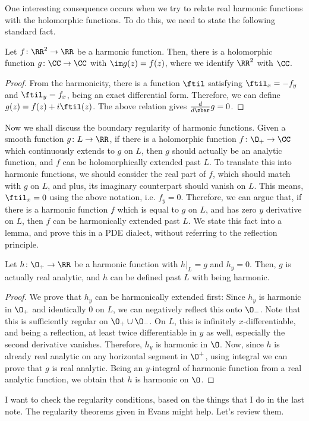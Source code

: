 \documentclass[a4paper]{amsart}
\begin{document}
One interesting consequence occurs when we try to relate real harmonic functions with the holomorphic functions. 
To do this, we need to state the following standard fact. 
\begin{lem*}
    Let \(f\colon \RR^2\to \RR\) be a harmonic function. 
    Then, there is a holomorphic function \(g\colon \CC\to \CC\) with \(\im g(z) = f(z)\), where we identify \(\RR^2\) with \(\CC\). 
\end{lem*}
\begin{proof}
    From the harmonicity, there is a function \(\ftil\) satisfying \(\ftil_x = -f_y\) and \(\ftil_y = f_x\), being an exact differential form. 
    Therefore, we can define \(g(z) = f(z) + i\ftil(z)\). 
    The above relation gives \(\frac{d}{d\zbar}g = 0\).
\end{proof}

Now we shall discuss the boundary regularity of harmonic functions. 
Given a smooth function \(g\colon L\to \RR\), if there is a holomorphic function \(f\colon \O_+\to \CC\) which continuously extends to \(g\) on \(L\), then \(g\) should actually be an analytic function, and \(f\) can be holomorphically extended past \(L\). 
To translate this into harmonic functions, we should consider the real part of \(f\), which should match with \(g\) on \(L\), and plus, its imaginary counterpart should vanish on \(L\). 
This means, \(\ftil_x = 0\) using the above notation, i.e. \(f_y = 0\). 
Therefore, we can argue that, if there is a harmonic function \(f\) which is equal to \(g\) on \(L\), and has zero \(y\) derivative on \(L\), then \(f\) can be harmonically extended past \(L\).
We state this fact into a lemma, and prove this in a PDE dialect, without referring to the reflection principle. 

\begin{lem*}
    Let \(h\colon \O_+\to \RR\) be a harmonic function with \(h|_L = g\) and \(h_y = 0\). 
    Then, \(g\) is actually real analytic, and \(h\) can be defined past \(L\) with being harmonic. 
\end{lem*}
\begin{proof}
    We prove that \(h_y\) can be harmonically extended first: Since \(h_y\) is harmonic in \(\O_+\) and identically \(0\) on \(L\), we can negatively reflect this onto \(\O_-\).
    Note that this is sufficiently regular on \(\O_+\cup\O_-\).
    On \(L\), this is infinitely \(x\)-differentiable, and being a reflection, at least twice differentiable in \(y\) as well, especially the second derivative vanishes. 
    Therefore, \(h_y\) is harmonic in \(\O\). 
    Now, since \(h\) is already real analytic on any horizontal segment in \(\O^+\), using integral we can prove that \(g\) is real analytic. 
    Being an \(y\)-integral of harmonic function from a real analytic function, we obtain that \(h\) is harmonic on \(\O\). 
\end{proof}

I want to check the regularity conditions, based on the things that I do in the last note. 
The regularity theorems given in Evans might help. Let's review them. 
\end{document}
